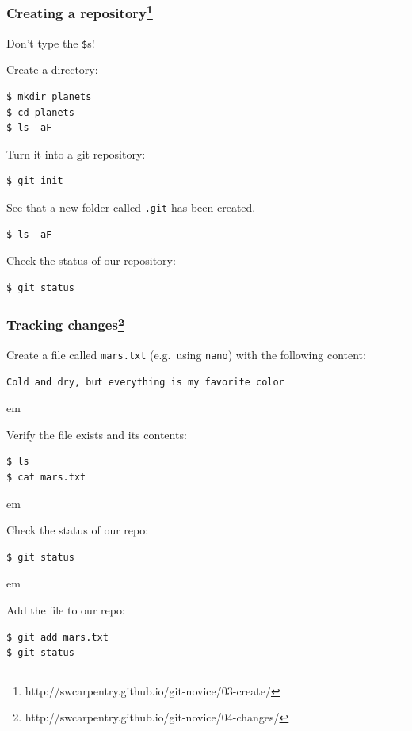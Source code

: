 \documentclass{beamer}
\begin{document}
\begin{frame}[fragile]
\frametitle{Creating a repository\footnote{http://swcarpentry.github.io/git-novice/03-create/}}

\textcolor{red!50!black}{Don't type the \texttt{\$}s!}

Create a directory:
\begin{verbatim}
$ mkdir planets
$ cd planets
$ ls -aF
\end{verbatim}

\pause
Turn it into a git repository:
\begin{verbatim}
$ git init
\end{verbatim}
\pause

See that a new folder called \texttt{.git} has been created.
\begin{verbatim}
$ ls -aF
\end{verbatim}
\pause

Check the status of our repository:
\begin{verbatim}
$ git status
\end{verbatim}

\end{frame}

\begin{frame}[fragile]
  \frametitle{Tracking changes\footnote{http://swcarpentry.github.io/git-novice/04-changes/}}

  Create a file called \texttt{mars.txt} (e.g.~using \texttt{nano}) with the following content:

\begin{verbatim}
Cold and dry, but everything is my favorite color
\end{verbatim}

  \pause

 em

Verify the file exists and its contents:

\begin{verbatim}
$ ls
$ cat mars.txt
\end{verbatim}

\pause

 em

Check the status of our repo:
\begin{verbatim}
$ git status
\end{verbatim}

 em
\pause

Add the file to our repo:
\begin{verbatim}
$ git add mars.txt
$ git status
\end{verbatim}

\end{frame}
\end{document}
